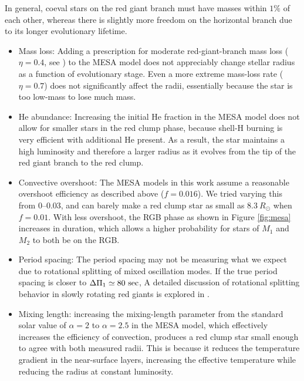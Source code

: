 In general, coeval stars on the red giant branch must have masses within $1\%$ of each other, whereas there is slightly more freedom on the horizontal branch due to its longer evolutionary lifetime. 
\begin{itemize}
\item Mass loss: Adding a prescription for moderate red-giant-branch mass loss ($\eta = 0.4$, see \citealt{mig12}) to the MESA model does not appreciably change stellar radius as a function of evolutionary stage. Even a more extreme mass-loss rate ($\eta = 0.7$) does not significantly affect the radii, essentially because the star is too low-mass to lose much mass.
\item He abundance: Increasing the initial He fraction in the MESA model does not allow for smaller stars in the red clump phase, because shell-H burning is very efficient with additional He present. As a result, the star maintains a high luminosity and therefore a larger radius as it evolves from the tip of the red giant branch to the red clump.
\item Convective overshoot: The MESA models in this work assume a reasonable overshoot efficiency as described above ($f = 0.016$). We tried varying this from 0--0.03, and can barely make a red clump star as small as $8.3 \ R_\odot$ when $f = 0.01$. With less overshoot, the RGB phase as shown in Figure \ref{fig:mesa} increases in duration, which allows a higher probability for stars of $M_1$ and $M_2$ to both be on the RGB.
\item Period spacing: The period spacing  may not be measuring what we expect due to rotational splitting of mixed oscillation modes. If the true period spacing is closer to $\Delta \Pi_1 \simeq 80 \ \rm{sec}$,  A detailed discussion of rotational splitting behavior in slowly rotating red giants is explored in \citet{gou13}.
\item Mixing length:  increasing the mixing-length parameter from the standard solar value of $\alpha = 2$ to $\alpha = 2.5$ in the MESA model, which effectively increases the efficiency of convection, produces a red clump star small enough to agree with both measured radii. This is because it reduces the temperature gradient in the near-surface layers, increasing the effective temperature while reducing the radius at constant luminosity. 
\end{itemize}
